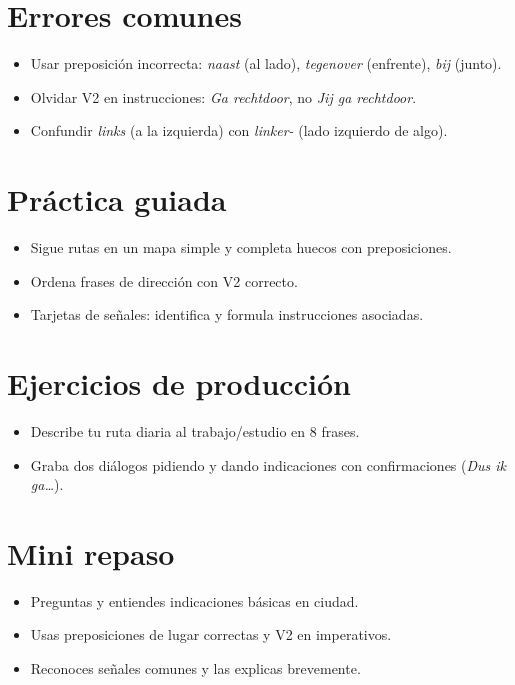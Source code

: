 \section{Errores comunes}
\begin{itemize}[leftmargin=*]
	\item Usar preposición incorrecta: \textit{naast} (al lado), \textit{tegenover} (enfrente), \textit{bij} (junto).
	\item Olvidar V2 en instrucciones: \textit{Ga rechtdoor}, no \textit{Jij ga rechtdoor}.
	\item Confundir \textit{links} (a la izquierda) con \textit{linker-} (lado izquierdo de algo).
\end{itemize}

\section{Práctica guiada}
\begin{itemize}[leftmargin=*]
	\item Sigue rutas en un mapa simple y completa huecos con preposiciones.
	\item Ordena frases de dirección con V2 correcto.
	\item Tarjetas de señales: identifica y formula instrucciones asociadas.
\end{itemize}

\section{Ejercicios de producción}
\begin{itemize}[leftmargin=*]
	\item Describe tu ruta diaria al trabajo/estudio en 8 frases.
	\item Graba dos diálogos pidiendo y dando indicaciones con confirmaciones (\textit{Dus ik ga\ldots{}}).
\end{itemize}

\section{Mini repaso}
\begin{itemize}[leftmargin=*]
	\item Preguntas y entiendes indicaciones básicas en ciudad.
	\item Usas preposiciones de lugar correctas y V2 en imperativos.
	\item Reconoces señales comunes y las explicas brevemente.
\end{itemize}


